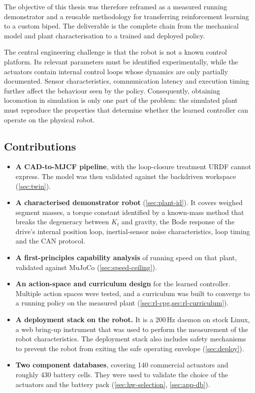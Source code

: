 The objective of this thesis was therefore reframed as a measured running demonstrator and a
reusable methodology for transferring reinforcement learning to a custom biped. The deliverable is
the complete chain from the mechanical model and plant characterisation to a trained and deployed
policy.

The central engineering challenge is that the robot is not a known control platform. Its relevant
parameters must be identified experimentally, while the actuators contain internal control loops
whose dynamics are only partially documented. Sensor characteristics, communication latency and
execution timing further affect the behaviour seen by the policy. Consequently, obtaining
locomotion in simulation is only one part of the problem: the simulated plant must reproduce the
properties that determine whether the learned controller can operate on the physical robot.

\newpage

\subsection{Contributions}
\label{sec:intro-contrib}

\begin{itemize}[leftmargin=*]
  \item \textbf{A CAD-to-MJCF pipeline}, with the loop-closure treatment URDF cannot express. The model was then validated against the
        backdriven workspace (\cref{sec:twin}).
  \item \textbf{A characterised demonstrator robot} (\cref{sec:plant-id}). It covers weighed segment masses, a torque
        constant identified by a known-mass method that breaks the degeneracy between $K_t$ and
        gravity, the Bode response of the drive's internal position loop, inertial-sensor noise
        characteristics, loop timing and the CAN protocol.
  \item \textbf{A first-principles capability analysis} of running speed on that plant, validated
        against MuJoCo (\cref{sec:speed-ceiling}).
  \item \textbf{An action-space and curriculum design} for the learned controller. 
        Multiple action spaces were tested, and a curriculum was built to converge to a running policy on the measured plant (\cref{sec:rl-cpg,sec:rl-curriculum}).
  \item \textbf{A deployment stack on the robot.} It is a 200\,Hz daemon on stock Linux, a web
        bring-up instrument that was used to perform the measurement of the robot characteristics.
        The deployment stack also includes safety mechanisms to prevent the robot from exiting the safe operating envelope (\cref{sec:deploy}).
  \item \textbf{Two component databases}, covering 140 commercial actuators and roughly 430 battery cells.
        They were used to validate the choice of the actuators and the battery pack (\cref{sec:hw-selection}, \cref{sec:app-db}).
\end{itemize}

